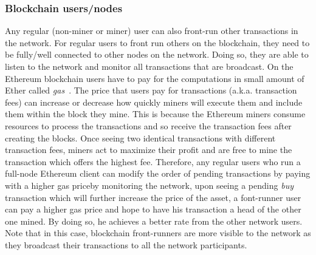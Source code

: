 \subsubsection{Blockchain users/nodes}
Any regular (non-miner or miner) user can also front-run other transactions in the network. For regular users to front run others on the blockchain, they need to be fully/well connected to other nodes on the network. Doing so, they are able to listen to the network and monitor all transactions that are broadcast. On the Ethereum blockchain users have to pay for the computations in small amount of Ether called \textit{gas}~\cite{AccountT67:online}. The price that users pay for transactions (a.k.a. transaction fees) can increase or decrease how quickly miners will execute them and include them within the block they mine. This is because the Ethereum miners consume resources to process the transactions and so receive the transaction fees after creating the blocks. Once seeing two identical transactions with different transaction fees, 
miners act to maximize their profit and are free to mine the transaction which offers the highest fee. Therefore, any regular users who run a full-node Ethereum client can modify the order of pending transactions by paying with a higher gas price\ie by monitoring the network, upon seeing a  pending \textit{buy} transaction which will further increase the price of the asset, a font-runner user can pay a higher gas price and hope to have his transaction a head of the other one mined. By doing so, he achieves a better rate from the other network users. Note that in this case, blockchain front-runners are more visible to the network as they broadcast their transactions to all the network participants. 


